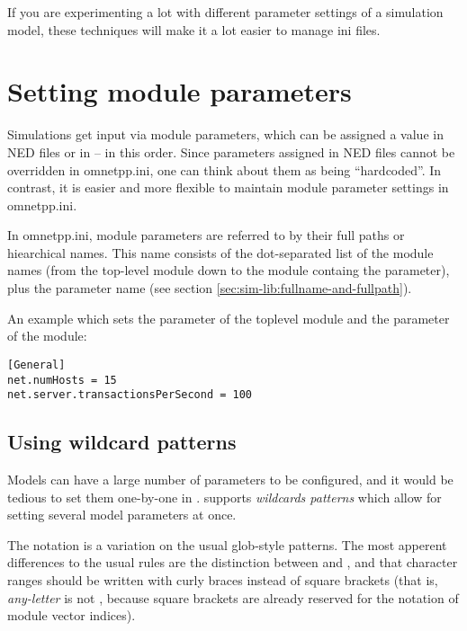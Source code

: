 If you are experimenting a lot with different parameter settings of a
simulation model, these techniques will make it a lot easier to manage
ini files.

\section{Setting module parameters}
\label{sec:ch-config-sim:parameter-settings}

Simulations get input via module parameters, which can be assigned a
value in NED files or in  -- in this order. Since parameters
assigned in NED files cannot be overridden in omnetpp.ini, one can
think about them as being ``hardcoded''. In contrast, it is easier
and more flexible to maintain module parameter settings in omnetpp.ini.

In omnetpp.ini, module parameters are referred to by their full paths
or hiearchical names. This name consists of the dot-separated list of
the module names (from the top-level module down to the module containg
the parameter), plus the parameter name
(see section \ref{sec:sim-lib:fullname-and-fullpath}).

An example  which sets the  parameter of
the toplevel module and the  parameter of the
 module:

\begin{verbatim}
[General]
net.numHosts = 15
net.server.transactionsPerSecond = 100
\end{verbatim}


\subsection{Using wildcard patterns}
\label{sec:ch-config-sim:wildcards}

Models can have a large number of parameters to be configured, and it would
be tedious to set them one-by-one in . {\opp} supports
\textit{wildcards patterns} which allow for setting several model parameters
at once.

The notation is a variation on the usual glob-style patterns.
The most apperent differences to the usual rules are the distinction between
\ttt{*} and \ttt{**}, and that character ranges should be written
with curly braces instead of square brackets (that is, \textit{any-letter}
is  not \ttt{[a-zA-Z]}, because square brackets are
already reserved for the notation of module vector indices).

